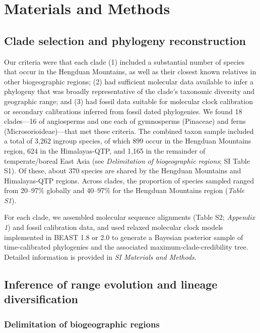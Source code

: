 \section{Materials and Methods}

\subsection{Clade selection and phylogeny reconstruction}

Our criteria were that each clade (1) included a substantial number of species that occur in the Hengduan Mountains, as well as their closest known relatives in other biogeographic regions; (2) had sufficient molecular data available to infer a phylogeny that was broadly representative of the clade's taxonomic diversity and geographic range; and (3) had fossil data suitable for molecular clock calibration or secondary calibrations inferred from fossil dated phylogenies. We found 18 clades---16 of angiosperms and one each of gymnosperms (Pinaceae) and ferns (Microsorioideae)---that met these criteria. The combined taxon sample included a total of 3,262 ingroup species, of which 899 occur in the Hengduan Mountains region, 624 in the Himalayas-QTP, and 1,165 in the remainder of temperate/boreal East Asia (see \textit{Delimitation of biogeographic regions}; SI Table S1). Of these, about 370 species are shared by the Hengduan Mountains and Himalayas-QTP regions. Across clades, the proportion of species sampled ranged from 20--97\% globally and 40--97\% for the Hengduan Mountains region (\textit{Table S1}).

For each clade, we assembled molecular sequence alignments (Table S2; \textit{Appendix 1}) and fossil calibration data, and used relaxed molecular clock models implemented in BEAST 1.8 \citep{Drummond2012} or 2.0 \citep{Bouckaert2014} to generate a Bayesian posterior sample of time-calibrated phylogenies and the associated maximum-clade-credibility tree.  Detailed information is provided in \textit{SI Materials and Methods}.


\subsection{Inference of range evolution and lineage diversification}

\subsubsection{Delimitation of biogeographic regions}

